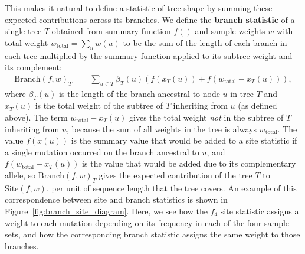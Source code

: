 \documentclass{article}
\newcommand{\branch}{\mbox{Branch}} %
\newcommand{\site}{\mbox{Site}} %
\newcommand{\iw}{w} %
\newcommand{\tiw}{w_\text{total}} %
\newcommand{\nw}{x} %
\begin{document}
This makes it natural to define
a statistic of tree shape by summing these expected contributions across its branches.
We define the \textbf{branch statistic} of a single tree $T$
obtained from summary function $f()$
and sample weights $\iw$ with total weight $\tiw = \sum_u \iw(u)$
to be the sum of the length of each branch in each tree
multiplied by the summary function applied to its subtree weight and its complement:
\begin{align}\label{eqn:branch_stat_tree}
    \branch(f, \iw)_T
    &=
    \sum_{u \in T} \beta_{T}(u) \left( f(\nw_{T}(u)) + f(\tiw - \nw_{T}(u)) \right)  ,
\end{align}
where $\beta_{T}(u)$ is the length of the branch ancestral to node $u$ in tree $T$
and $\nw_{T}(u)$ is the total weight of the subtree of $T$ inheriting from $u$ (as defined above).
The term $\tiw - \nw_{T}(u)$ gives the total weight \emph{not} in the subtree of $T$ inheriting from $u$,
because the sum of all weights in the tree is always $\tiw$.
The value $f(\nw(u))$ is the summary value that would be added to a site statistic
if a single mutation occurred on the branch ancestral to $u$,
and $f(\tiw - \nw_{T}(u))$ is the value that would be added due to its complementary allele,
so $\branch(f, \iw)_T$ gives the expected contribution of the tree $T$ to $\site(f, \iw)$,
per unit of sequence length that the tree covers.
An example of this correspondence between site and branch statistics
is shown in Figure~\ref{fig:branch_site_diagram}. Here, we
see how the $f_4$ site statistic assigns a weight to each mutation
depending on its frequency in each of the four sample sets,
and how the corresponding branch statistic assigns the same weight to those branches.
\end{document}

